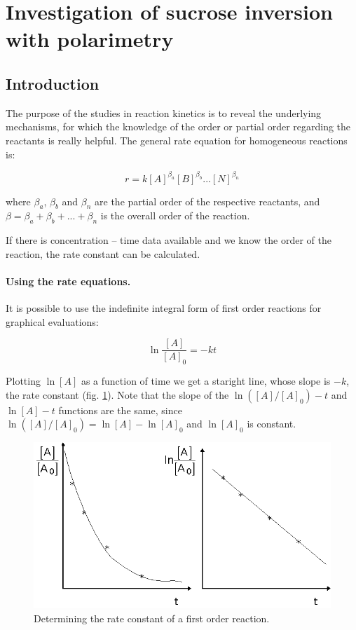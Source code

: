 \section{Investigation of sucrose inversion with polarimetry}
\subsection{Introduction}
The purpose of the studies in reaction kinetics is to reveal the underlying mechanisms, for which the knowledge of the order or partial order regarding the reactants is really helpful.
The general rate equation for homogeneous reactions is:

\begin{equation}
\label{eq:general}
	r
	=
	k[A]^{\beta_a}[B]^{\beta_b}...[N]^{\beta_n}
\end{equation}

where $\beta_a$, $\beta_b$ and $\beta_n$ are the partial order of the respective reactants, and $\beta = \beta_a + \beta_b + ... + \beta_n$ is the overall order of the reaction.

If there is concentration -- time data available and we know the order of the reaction, the rate constant can be calculated.

\paragraph{Using the rate equations.}
It is possible to use the indefinite integral form of first order reactions for graphical evaluations:

\begin{equation}
\label{eq:2}
	\ln 
	\frac{[A]}{[A]_0}
	=
	- k
	t
\end{equation}

Plotting $\ln [A]$ as a function of time we get a staright line, whose slope is $-k$, the rate constant (fig. \ref{fig:els_1}). Note that the slope of the $\ln ([A]/[A]_0) - t$ and $\ln [A] - t$ functions are the same, since $\ln ([A]/[A]_0) = \ln [A] - \ln [A]_0$ and $\ln [A]_0$ is constant.

\begin{figure}[b]
\centering
\includegraphics{fig/els1.eps}
\caption{Determining the rate constant of a first order reaction.}
\label{fig:els_1}
\end{figure}

